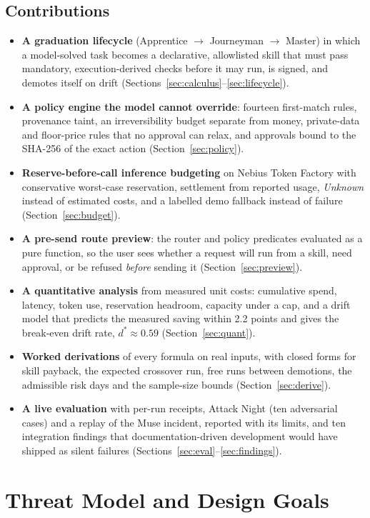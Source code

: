 \documentclass[11pt]{article}
\begin{document}
\subsection{Contributions}
\begin{itemize}
\item \textbf{A graduation lifecycle} (Apprentice $\to$ Journeyman $\to$ Master) in which a model-solved task becomes
a declarative, allowlisted skill that must pass mandatory, execution-derived checks before it may run, is signed, and
demotes itself on drift (Sections~\ref{sec:calculus}--\ref{sec:lifecycle}).
\item \textbf{A policy engine the model cannot override}: fourteen first-match rules, provenance taint, an
irreversibility budget separate from money, private-data and floor-price rules that no approval can relax, and
approvals bound to the SHA-256 of the exact action (Section~\ref{sec:policy}).
\item \textbf{Reserve-before-call inference budgeting} on Nebius Token Factory with conservative worst-case
reservation, settlement from reported usage, \emph{Unknown} instead of estimated costs, and a labelled demo fallback
instead of failure (Section~\ref{sec:budget}).
\item \textbf{A pre-send route preview}: the router and policy predicates evaluated as a pure function, so the user
sees whether a request will run from a skill, need approval, or be refused \emph{before} sending it
(Section~\ref{sec:preview}).
\item \textbf{A quantitative analysis} from measured unit costs: cumulative spend, latency, token use, reservation
headroom, capacity under a cap, and a drift model that predicts the measured saving within 2.2 points and gives the
break-even drift rate, $d^\ast\approx0.59$ (Section~\ref{sec:quant}).
\item \textbf{Worked derivations} of every formula on real inputs, with closed forms for skill payback, the
expected crossover run, free runs between demotions, the admissible risk days and the sample-size bounds
(Section~\ref{sec:derive}).
\item \textbf{A live evaluation} with per-run receipts, Attack Night (ten adversarial cases) and a replay of the Muse
incident, reported with its limits, and ten integration findings that documentation-driven development would have
shipped as silent failures (Sections~\ref{sec:eval}--\ref{sec:findings}).
\end{itemize}

\section{Threat Model and Design Goals}
\end{document}
